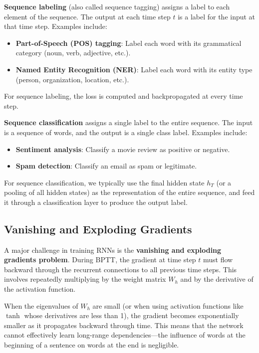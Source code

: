 \documentclass[11pt,a4paper]{article}
\begin{document}
\textbf{Sequence labeling} (also called sequence tagging) assigns a label to each element of the sequence. The output at each time step $t$ is a label for the input at that time step. Examples include:
\begin{itemize}
    \item \textbf{Part-of-Speech (POS) tagging}: Label each word with its grammatical category (noun, verb, adjective, etc.).
    \item \textbf{Named Entity Recognition (NER)}: Label each word with its entity type (person, organization, location, etc.).
\end{itemize}

For sequence labeling, the loss is computed and backpropagated at every time step.

\textbf{Sequence classification} assigns a single label to the entire sequence. The input is a sequence of words, and the output is a single class label. Examples include:
\begin{itemize}
    \item \textbf{Sentiment analysis}: Classify a movie review as positive or negative.
    \item \textbf{Spam detection}: Classify an email as spam or legitimate.
\end{itemize}

For sequence classification, we typically use the final hidden state $h_T$ (or a pooling of all hidden states) as the representation of the entire sequence, and feed it through a classification layer to produce the output label.

\subsection{Vanishing and Exploding Gradients}

A major challenge in training RNNs is the \textbf{vanishing and exploding gradients problem}. During BPTT, the gradient at time step $t$ must flow backward through the recurrent connections to all previous time steps. This involves repeatedly multiplying by the weight matrix $W_h$ and by the derivative of the activation function.

When the eigenvalues of $W_h$ are small (or when using activation functions like $\tanh$ whose derivatives are less than 1), the gradient becomes exponentially smaller as it propagates backward through time. This means that the network cannot effectively learn long-range dependencies---the influence of words at the beginning of a sentence on words at the end is negligible.
\end{document}
